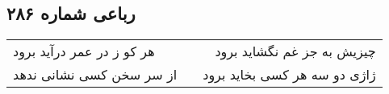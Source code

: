 \begin{center}
\section*{رباعی شماره ۲۸۶}
\label{sec:sh286}
\begin{longtable}{l p{0.5cm} r}
هر کو ز در عمر درآید برود
&&
چیزیش به جز غم نگشاید برود
\\
از سر سخن کسی نشانی ندهد
&&
ژاژی دو سه هر کسی بخاید برود
\\
\end{longtable}
\end{center}
